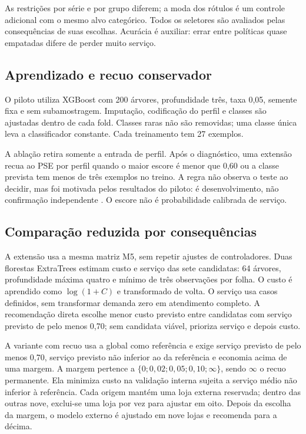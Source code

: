 As restrições por série e por grupo diferem; a moda dos rótulos é um controle adicional com o mesmo alvo categórico. Todos os seletores são avaliados pelas consequências de suas escolhas. Acurácia é auxiliar: errar entre políticas quase empatadas difere de perder muito serviço.

\subsection{Aprendizado e recuo conservador}
O piloto utiliza XGBoost com 200 árvores, profundidade três, taxa 0,05, semente fixa e sem subamostragem. Imputação, codificação do perfil e classes são ajustadas dentro de cada fold. Classes raras não são removidas; uma classe única leva a classificador constante. Cada treinamento tem 27 exemplos.

A ablação retira somente a entrada de perfil. Após o diagnóstico, uma extensão recua ao PSE por perfil quando o maior escore é menor que 0,60 ou a classe prevista tem menos de três exemplos no treino. A regra não observa o teste ao decidir, mas foi motivada pelos resultados do piloto: é desenvolvimento, não confirmação independente \citep{CawleyTalbot2010}. O escore não é probabilidade calibrada de serviço.

\subsection{Comparação reduzida por consequências}
A extensão usa a mesma matriz M5, sem repetir ajustes de controladores. Duas florestas ExtraTrees estimam custo e serviço das sete candidatas: 64 árvores, profundidade máxima quatro e mínimo de três observações por folha. O custo é aprendido como $\log(1+C)$ e transformado de volta. O serviço usa casos definidos, sem transformar demanda zero em atendimento completo. A recomendação direta escolhe menor custo previsto entre candidatas com serviço previsto de pelo menos 0,70; sem candidata viável, prioriza serviço e depois custo.

A variante com recuo usa a global como referência e exige serviço previsto de pelo menos 0,70, serviço previsto não inferior ao da referência e economia acima de uma margem. A margem pertence a $\{0;0{,}02;0{,}05;0{,}10;\infty\}$, sendo $\infty$ o recuo permanente. Ela minimiza custo na validação interna sujeita a serviço médio não inferior à referência. Cada origem mantém uma loja externa reservada; dentro das outras nove, exclui-se uma loja por vez para ajustar em oito. Depois da escolha da margem, o modelo externo é ajustado em nove lojas e recomenda para a décima.

